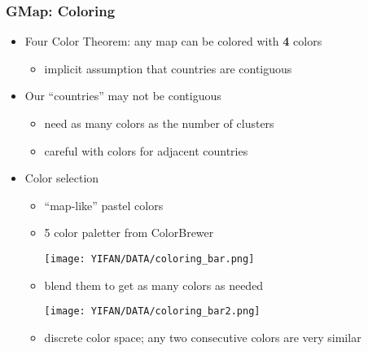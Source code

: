 \documentclass{beamer}
\begin{document}
\begin{frame}[plain]
\frametitle{GMap: Coloring}
\begin{itemize}
\item{} Four Color Theorem: any map can be colored with {\bf 4} colors
\begin{itemize}
\item{} implicit assumption that countries are contiguous
\end{itemize}
\item{} Our ``countries'' may not be contiguous
\begin{itemize}
\item{} need as many colors as the number of clusters%
\item careful with colors for adjacent countries
\end{itemize}

\item{} Color selection
\begin{itemize}
\item ``map-like'' pastel colors
\item  5 color paletter from ColorBrewer

\begin{center}
  \vspace{-.5cm}\texttt{[image: YIFAN/DATA/coloring\_bar.png]}\vspace{-.5cm}
\end{center}
\item{} blend them to get as many colors as needed

\begin{center}
  \vspace{-.5cm}\texttt{[image: YIFAN/DATA/coloring\_bar2.png]}\vspace{-.5cm}
\end{center}

\item{} discrete color space; any two consecutive colors are very similar
\end{itemize}
\end{itemize}

\end{frame}
\end{document}
